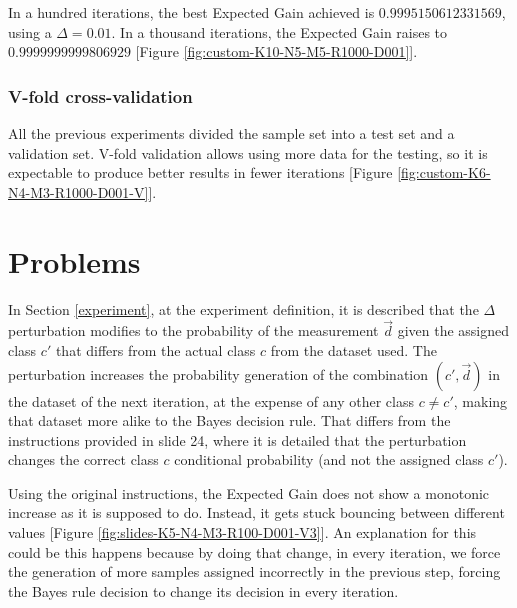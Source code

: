 \documentclass[letterpaper, conference]{IEEEtran}
\begin{document}


In a hundred iterations, the best Expected Gain achieved is $0.9995150612331569$, using a $\Delta = 0.01$. In a thousand iterations, the Expected Gain raises to $0.9999999999806929$ [Figure \ref{fig:custom-K10-N5-M5-R1000-D001}].




\subsubsection{V-fold cross-validation}

All the previous experiments divided the sample set into a test set and a validation set. V-fold validation allows using more data for the testing, so it is expectable to produce better results in fewer iterations [Figure \ref{fig:custom-K6-N4-M3-R1000-D001-V}].



\section{Problems}\label{problems}

In Section \ref{experiment}, at the experiment definition, it is described that the $\Delta$ perturbation modifies to the probability of the measurement $\vec{d}$ given the assigned class $c'$ that differs from the actual class $c$ from the dataset used. The perturbation increases the probability generation of the combination $(c', \vec{d})$ in the dataset of the next iteration, at the expense of any other class $c \neq c'$, making that dataset more alike to the Bayes decision rule. That differs from the instructions provided in \cite{midterm-project} slide 24, where it is detailed that the perturbation changes the correct class $c$ conditional probability (and not the assigned class $c'$).

Using the original instructions, the Expected Gain does not show a monotonic increase as it is supposed to do. Instead, it gets stuck bouncing between different values [Figure \ref{fig:slides-K5-N4-M3-R100-D001-V3}]. An explanation for this could be this happens because by doing that change, in every iteration, we force the generation of more samples assigned incorrectly in the previous step, forcing the Bayes rule decision to change its decision in every iteration.


\end{document}
